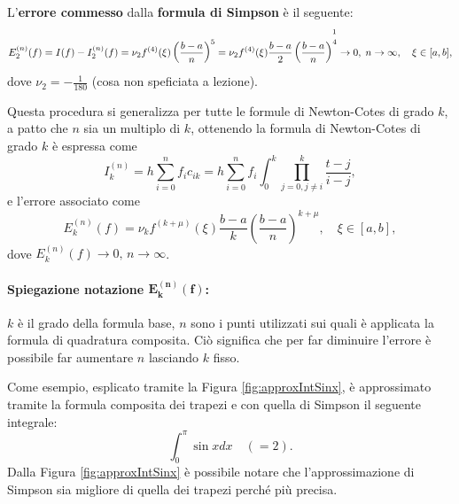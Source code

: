 \begin{definition}
    L'\textbf{errore commesso} dalla \textbf{formula di Simpson} è il seguente:
    \begin{equation}\label{eq:errFormSimpComp}
        E_2^{(n)}(f)=I(f)-I_2^{(n)}(f)=\nu_2 f^{(4)}(\xi)\left(\frac{b-a}{n}\right)^5 = \nu_2f^{(4)}(\xi)\frac{b-a}{2}\left(\frac{b-a}{n}\right)^{\overset{\footnotemark}{4}}\rightarrow 0,\; n\rightarrow\infty,\quad \xi\in[a,b],
    \end{equation}
    dove $\nu_2 = -\frac{1}{180}$ (cosa non speficiata a lezione).
\end{definition}

Questa procedura si generalizza per tutte le formule di Newton-Cotes di grado $k$, a patto che $n$ sia un multiplo di $k$, ottenendo la formula di Newton-Cotes di grado $k$ è espressa come
\begin{equation*}
    I_k^{(n)}=h\sum_{i=0}^nf_ic_{ik}=h\sum_{i=0}^nf_i\int_0^k\prod_{j=0, j\neq i}^k\frac{t-j}{i-j},
\end{equation*}
e l'errore associato come
\begin{equation}\label{eq:EkComposite}
 E_k^{(n)}(f)=\nu_kf^{(k+\mu)}(\xi)\frac{b-a}{k}\left(\frac{b-a}{n}\right)^{k+\mu}, \quad \xi\in[a,b],
\end{equation}
dove $E_k^{(n)}(f)\rightarrow 0,\, n\rightarrow\infty$.

\paragraph{Spiegazione notazione $\boldsymbol{E_k^{(n)}(f)}$:} $k$ è il grado della formula base, $n$ sono i punti utilizzati sui quali è applicata la formula di quadratura composita. Ciò significa che per far diminuire l'errore è possibile far aumentare $n$ lasciando $k$ fisso.

\begin{example}
    Come esempio, esplicato tramite la Figura \ref{fig:approxIntSinx}, è approssimato tramite la formula composita dei trapezi e con quella di Simpson il seguente integrale:
    \begin{equation}\label{eq:approxIntSinx}
        \int_0^\pi \sin{x}dx\quad (=2).
    \end{equation}
    Dalla Figura \ref{fig:approxIntSinx} è possibile notare che l'approssimazione di Simpson sia migliore di quella dei trapezi perché più precisa.
\end{example}

